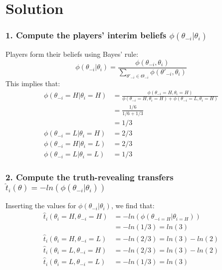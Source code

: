 \documentclass[a4paper]{article}
\newif\ifsolutions
\begin{document}
\ifsolutions
\section*{Solution}
	
	\subsubsection*{1. Compute the players' interim beliefs $\phi(\theta_{-i}|\theta_{i})$}
	Players form their beliefs using Bayes' rule:
	\begin{equation}
		\phi(\theta_{-i}|\theta_{i})=\frac{\phi(\theta_{-i},\theta_{i})}{\sum_{\theta'_{-i}\in\Theta_{-i}}\phi(\theta'_{-i},\theta_{i})}
	\end{equation}
	This implies that: 
	\begin{align}
		\phi(\theta_{-i}=H|\theta_{i}=H) &= \frac{\phi(\theta_{-i}=H,\theta_{i}=H)}{\phi(\theta_{-i}=H,\theta_{i}=H)+\phi(\theta_{-i}=L,\theta_{i}=H)} \nonumber \\ 
		&= \frac{1/6}{1/6 + 1/3} \nonumber \\ 
		&= 1/3\\
		\phi(\theta_{-i}=L|\theta_{i}=H)&=2/3\\
		\phi(\theta_{-i}=H|\theta_{i}=L)&=2/3\\
		\phi(\theta_{-i}=L|\theta_{i}=L)&=1/3
	\end{align}
	
	
	\subsubsection*{2. Compute the truth-revealing transfers $\hat{t}_{i}(\theta)=-ln(\phi(\theta_{-i}|\theta_{i}))$}
	Inserting the values for $\phi(\theta_{-i}|\theta_{i})$, we find that:
	\begin{align}
		\hat{t}_{i}(\theta_{i}=H,\theta_{-i}=H)&=-ln(\phi(\theta_{-i=H}|\theta_{i=H})) \nonumber \\ 
		&= -ln(1/3) = ln(3)\\
		\hat{t}_{i}(\theta_{i}=H,\theta_{-i}=L)&=-ln(2/3)=ln(3)-ln(2)\\
		\hat{t}_{i}(\theta_{i}=L,\theta_{-i}=H)&=-ln(2/3)=ln(3)-ln(2)\\
		\hat{t}_{i}(\theta_{i}=L,\theta_{-i}=L)&=-ln(1/3)=ln(3)
	\end{align}
	
	
\end{document}
